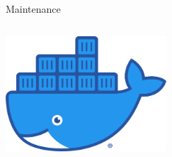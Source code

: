 \begin{frame}[t]{Maintenance}
\begin{columns}
\begin{column}{0.4\textwidth}
            \vspace{1em}
            \includegraphics[width=0.45\textwidth]{figures/docker-logo.png} \\
        \end{column}
    \end{columns}

\end{frame}